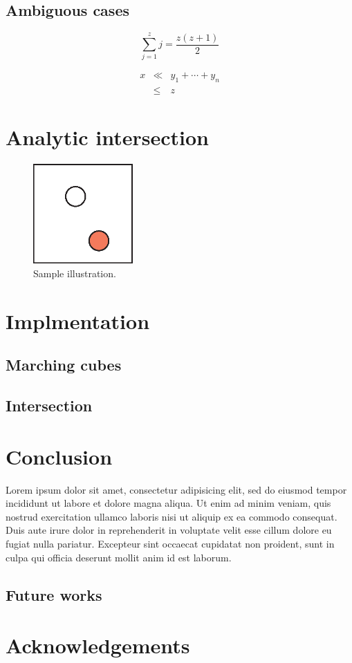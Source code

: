 \documentclass[conference]{acmsiggraph}
\begin{document}
\subsection{Ambiguous cases}

\begin{equation}
 \sum_{j=1}^{z} j = \frac{z(z+1)}{2}
\end{equation}

\begin{eqnarray}
x & \ll & y_{1} + \cdots + y_{n} \\
  & \leq & z
\end{eqnarray}

\section{Analytic intersection}


\begin{figure}[ht]
  \centering
  \includegraphics[width=1.5in]{images/samplefigure}
  \caption{Sample illustration.}
\end{figure}

\section{Implmentation}

\subsection{Marching cubes}

\subsection{Intersection}

\section{Conclusion}

Lorem ipsum dolor sit amet, consectetur adipisicing elit, sed do
eiusmod tempor incididunt ut labore et dolore magna aliqua. Ut enim ad
minim veniam, quis nostrud exercitation ullamco laboris nisi ut
aliquip ex ea commodo consequat. Duis aute irure dolor in
reprehenderit in voluptate velit esse cillum dolore eu fugiat nulla
pariatur. Excepteur sint occaecat cupidatat non proident, sunt in
culpa qui officia deserunt mollit anim id est laborum.

\subsection{Future works}

\section*{Acknowledgements}




\end{document}

